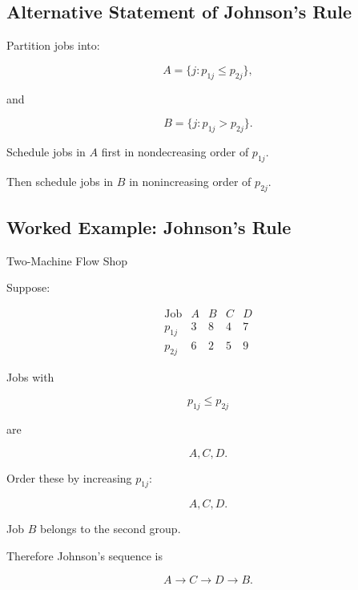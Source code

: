 \subsection{Alternative Statement of Johnson's Rule}
\label{subsec:johnsons-rule-partition}

Partition jobs into:

\[
\boxed{
A
=
\{
j:
p_{1j}\leq p_{2j}
\},
}
\]

and

\[
\boxed{
B
=
\{
j:
p_{1j}>p_{2j}
\}.
}
\]

Schedule jobs in \(A\) first in nondecreasing order of \(p_{1j}\).

Then schedule jobs in \(B\) in nonincreasing order of \(p_{2j}\).

\subsection{Worked Example: Johnson's Rule}
\label{subsec:worked-johnson}

\begin{workedexamplebox}{Two-Machine Flow Shop}

Suppose:

\[
\begin{array}{c|cccc}
\text{Job}
&
A
&
B
&
C
&
D
\\
\hline
p_{1j}
&
3
&
8
&
4
&
7
\\
p_{2j}
&
6
&
2
&
5
&
9
\end{array}
\]

Jobs with

\[
p_{1j}\leq p_{2j}
\]

are

\[
A,C,D.
\]

Order these by increasing \(p_{1j}\):

\[
A,C,D.
\]

Job \(B\) belongs to the second group.

Therefore Johnson's sequence is

\begin{answerbox}
\[
\boxed{
A\to C\to D\to B.
}
\]
\end{answerbox}

\end{workedexamplebox}

